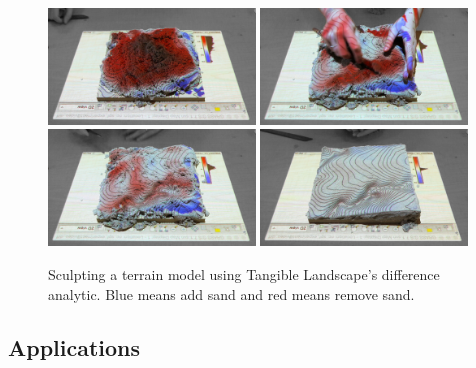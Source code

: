\documentclass[prodmode,acmtochi]{acmsmall} %
\begin{document}
\begin{figure}
\begin{center}
		\includegraphics[width=0.49\textwidth]{images/difference/tl_difference_1.jpg}
		\includegraphics[width=0.49\textwidth]{images/difference/tl_difference_2.jpg}\vspace*{0.2em}
		\includegraphics[width=0.49\textwidth]{images/difference/tl_difference_3.jpg}
		\includegraphics[width=0.49\textwidth]{images/difference/tl_difference_4.jpg}
	\caption{Sculpting a terrain model using Tangible Landscape's difference analytic.
	Blue means add sand and red means remove sand.
	}
	\label{fig:difference_sequence}
\end{center}
\end{figure}

\subsection{Applications}
\end{document}
